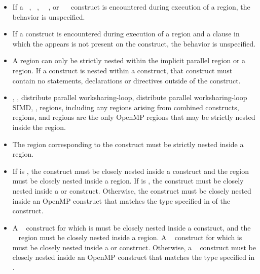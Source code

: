 \begin{itemize}
\item If a ~, ~,
~~, or
~~ construct is encountered during
execution of a  region, the behavior is unspecified.

\item If a  construct is encountered during execution of a
 region and a  clause in which the 
 appears is not present on the construct, the behavior is unspecified.

\item A  region can only be strictly nested within the implicit parallel region or a  region.
If a  construct is nested within a  construct,
that  construct must contain no statements, declarations or
directives outside of the  construct.

\item {}, , distribute parallel worksharing-loop,
  distribute parallel worksharing-loop SIMD, ,  regions, including any
 regions arising from combined constructs,  regions, and  regions are the only OpenMP regions
that may be strictly nested inside the  region.

\item The region corresponding to the  construct must be
strictly nested inside a  region.

\item If  is , the 
construct must be closely nested inside a  construct and the
 region must be closely nested inside a  region. If
 is , the  construct
must be closely nested inside a  or  construct.
Otherwise, the  construct must be closely
nested inside an OpenMP construct that matches the type specified in
 of the  construct.

\item A ~ construct for which
 is  must be closely nested
inside a  construct, and the ~
region must be closely nested inside a  region. A
~ construct for which
 is  must be closely nested
inside a  or  construct. Otherwise, a
~ construct must be closely nested inside
an OpenMP construct that matches the type specified in
.


\end{itemize}
